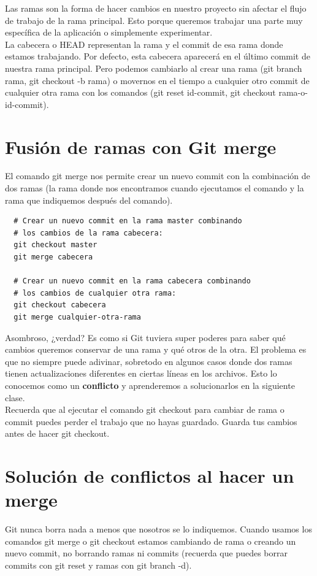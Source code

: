 \documentclass{article}
\begin{document}
Las ramas son la forma de hacer cambios en nuestro proyecto sin afectar el
flujo de trabajo de la rama principal. Esto porque queremos trabajar una parte
muy específica de la aplicación o simplemente experimentar.\\

La cabecera o HEAD representan la rama y el commit de esa rama donde estamos
trabajando. Por defecto, esta cabecera aparecerá en el último commit de nuestra
rama principal. Pero podemos cambiarlo al crear una rama (git branch rama, git
checkout -b rama) o movernos en el tiempo a cualquier otro commit de cualquier
otra rama con los comandos (git reset id-commit, git checkout
rama-o-id-commit).\\

\section{Fusión de ramas con Git merge}%
El comando git merge nos permite crear un nuevo commit con la combinación de
dos ramas (la rama donde nos encontramos cuando ejecutamos el comando y la rama
que indiquemos después del comando).\\

\begin{verbatim}
  # Crear un nuevo commit en la rama master combinando
  # los cambios de la rama cabecera:
  git checkout master
  git merge cabecera

  # Crear un nuevo commit en la rama cabecera combinando
  # los cambios de cualquier otra rama:
  git checkout cabecera
  git merge cualquier-otra-rama
\end{verbatim}

Asombroso, ¿verdad? Es como si Git tuviera super poderes para saber qué cambios
queremos conservar de una rama y qué otros de la otra. El problema es que no
siempre puede adivinar, sobretodo en algunos casos donde dos ramas tienen
actualizaciones diferentes en ciertas líneas en los archivos. Esto lo conocemos
como un \textbf{conflicto} y aprenderemos a solucionarlos en la siguiente
clase.\\

Recuerda que al ejecutar el comando git checkout para cambiar de rama o commit
puedes perder el trabajo que no hayas guardado. Guarda tus cambios antes de
hacer git checkout.

\section{Solución de conflictos al hacer un merge}%
Git nunca borra nada a menos que nosotros se lo indiquemos. Cuando usamos los
comandos git merge o git checkout estamos cambiando de rama o creando un nuevo
commit, no borrando ramas ni commits (recuerda que puedes borrar commits con
git reset y ramas con git branch -d).\\
\end{document}
